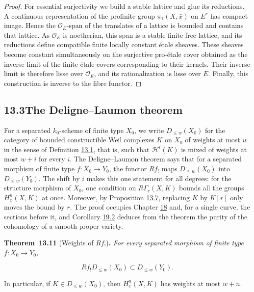 \documentclass[11pt]{article}
\newenvironment{bpstatement}[2]{\par\addvspace{0.6\baselineskip}\noindent\textbf{#1}#2\textbf{.}\enspace\ignorespaces}
  {\par\addvspace{0.4\baselineskip}}
\newenvironment{bpstatementit}[2]{\begin{bpstatement}{#1}{#2}\itshape\ignorespaces}{\end{bpstatement}}
\begin{document}
\begin{proof}[{Proof}]
For essential surjectivity we build a stable lattice and glue its reductions. A continuous representation of the profinite group \(\pi_1(X,\bar x)\) on \(E^r\) has compact image. Hence the \(\mathcal O_E\)-span of the translates of a lattice is bounded and contains that lattice. As \(\mathcal O_E\) is noetherian, this span is a stable finite free lattice, and its reductions define compatible finite locally constant étale sheaves. These sheaves become constant simultaneously on the surjective pro-étale cover obtained as the inverse limit of the finite étale covers corresponding to their kernels. Their inverse limit is therefore lisse over \(\mathcal O_E\), and its rationalization is lisse over \(E\). Finally, this construction is inverse to the fibre functor.
\end{proof}


\subsection*{\texorpdfstring{13.3\quad The Deligne–Laumon theorem}{13.3 The Deligne–Laumon theorem}}
\label{bp36}%
\label{bp37}%
For a separated \(k_0\)-scheme of finite type \(X_0\), we write \(D_{\leq w}(X_0)\) for the category of bounded constructible Weil complexes \(K\) on \(X_0\) of weights at most \(w\) in the sense of Definition \hyperref[bp9]{13.1}, that is, such that \(\mathcal H^i(K)\) is mixed of weights at most \(w+i\) for every \(i\). The Deligne–Laumon theorem says that for a separated morphism of finite type \(f:X_0\to Y_0\), the functor \(Rf_!\) maps \(D_{\leq w}(X_0)\) into \(D_{\leq w}(Y_0)\). The shift by \(i\) makes this one statement for all degrees: for the structure morphism of \(X_0\), one condition on \(R\Gamma_c(X,K)\) bounds all the groups \(H^n_c(X,K)\) at once. Moreover, by Proposition \hyperref[bp24]{13.7}, replacing \(K\) by \(K[r]\) only moves the bound by \(r\). The proof occupies Chapter \hyperref[bp271]{18} and, for a single curve, the sections before it, and Corollary \hyperref[bp326]{19.2} deduces from the theorem the purity of the cohomology of a smooth proper variety.

\label{bp38}%
\begin{bpstatementit}{Theorem~13.11}{ (Weights of $Rf_!$)}
For every separated morphism of finite type \(f:X_0\to Y_0\),

\[
Rf_!D_{\leq w}(X_0)\subset D_{\leq w}(Y_0).
\]

In particular, if \(K\in D_{\leq w}(X_0)\), then \(H_c^n(X,K)\) has weights at most \(w+n\).
\end{bpstatementit}
\end{document}
